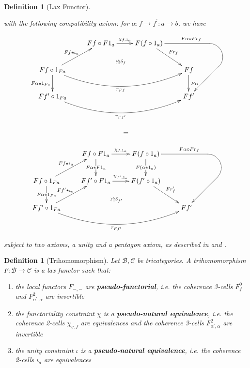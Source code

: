 \documentclass{article}
\numberwithin{equation}{section}
\theoremstyle{definition}
\theoremstyle{plain}
\newtheorem{definition}[equation]{Definition}
\begin{document}
\begin{definition}[Lax Functor]
\begin{enumerate}[label = $\bullet$]
		with the following compatibility axiom: for $\alpha: f \to f^{\prime}: a \to b$, we have
		
		\[\begin{array}{c}
			\xymatrix{
				& Ff \circ F1_a \ar[r]^{\chi_{f,1_a}} & F(f \circ 1_a) \ar[dr]^{Fr_f} \ar`_dl/20pt[ddr]^(0.7){F\alpha\circ Fr_f}
				[ddr]\\
				Ff \circ 1_{Fa} \ar[d]_{F\alpha \star 1_{Fa}} \ar[ur]^{Ff \star \iota_a} \ar@/_2pc/[rrr]_{r_{Ff}} \ar@/^1pc/@{{}{ }{}}[rrr]|{\wr \Uparrow \delta_f} &&& Ff \ar[d]^{F\alpha}\\
				Ff^{\prime} \circ 1_{Fa} \ar@/_2pc/[rrr]_{r_{Ff^{\prime}}} &&& Ff^{\prime}\\
			}\\
			\\
			=\\
			\\
			\xymatrix{
				& Ff \circ F1_a \ar[d]|{F\alpha \star F1_a} \ar[r]^{\chi_{f,1_a}} & F(f \circ 1_a) \ar[d]|{F(\alpha \star 1_a)} \ar`_dl/20pt[ddr]^(0.7){F\alpha\circ Fr_f}
				[ddr]\\
				Ff \circ 1_{Fa} \ar[ur]^{Ff \star \iota_a} \ar[d]|{F\alpha \star 1_{Fa}} & Ff^{\prime} \circ F1_a \ar[r]^{\chi_{f^{\prime}, 1_a}} & F(f^{\prime}\circ 1_a) \ar[dr]^{Fr_f^{\prime}}\\
				Ff^{\prime} \circ 1_{Fa} \ar[ur]^{Ff^{\prime}\star \iota_a} \ar@/_2pc/[rrr]_{r_{Ff^{\prime}}} \ar@/^1pc/@{{}{ }{}}[rrr]|{\wr \Uparrow \delta_{f^{\prime}}} &&& Ff^{\prime}\\
			}
		\end{array}\]
		
	\end{enumerate}
	subject to two axioms, a unity and a pentagon axiom, as described in \cite{gordon1995coherence} and \cite{gurski_2013}.
\end{definition}

\begin{definition}[Trihomomorphism] Let $\mathcal{B}, \mathcal{C}$ be tricategories. A trihomomorphism $F:\mathcal{B} \to \mathcal{C}$ is a lax functor such that:
	\begin{enumerate}[label = $(\roman*)$]
		\item the local functors $F_{-,-}$ are \textbf{pseudo-functorial}, \textnormal{i.e.} the coherence 3-cells $F^0_f$ and $F^2_{\alpha^{\prime},\alpha}$ are invertible
		\item the functoriality constraint $\chi$ is a \textbf{pseudo-natural equivalence}, \textnormal{i.e.} the coherence 2-cells $\chi_{g,f}$ are equivalences and the coherence 3-cells $F^2_{\alpha^{\prime},\alpha}$ are invertible
		\item the unity constraint $\iota$ is a \textbf{pseudo-natural equivalence}, \textnormal{i.e.} the coherence 2-cells $\iota_a$ are equivalences
	\end{enumerate}
\end{definition}
\end{document}
